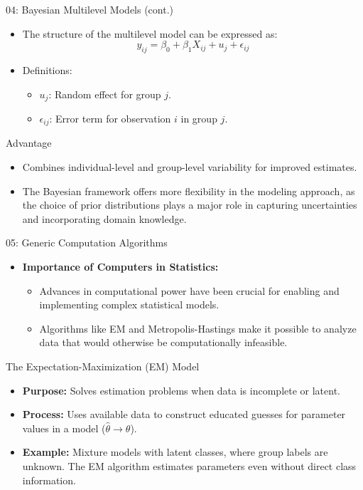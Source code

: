 \documentclass{beamer}
\begin{document}
\begin{frame}{04: Bayesian Multilevel Models (cont.)}
\begin{itemize}
    \item The structure of the multilevel model can be expressed as:
    \[
    y_{ij} = \beta_0 + \beta_1 X_{ij} + u_j + \epsilon_{ij}
    \]
    \item Definitions:
    \begin{itemize}
        \item \( u_j \): Random effect for group \( j \).
        \item \( \epsilon_{ij} \): Error term for observation \( i \) in group \( j \).
    \end{itemize}
\end{itemize}

\begin{block}{Advantage}
\begin{itemize}
\item Combines individual-level and group-level variability for improved estimates.
\item The Bayesian framework offers more flexibility in the modeling approach, as the choice of prior distributions plays a major role in capturing uncertainties and incorporating domain knowledge.
\end{itemize}
\end{block}
\end{frame}



\begin{frame}{05: Generic Computation Algorithms}
\begin{itemize}
    \item \textbf{Importance of Computers in Statistics:}
    \begin{itemize}
        \item Advances in computational power have been crucial for enabling and implementing complex statistical models.
        \item Algorithms like EM and Metropolis-Hastings make it possible to analyze data that would otherwise be computationally infeasible.
    \end{itemize}
\end{itemize}
\end{frame}

\begin{frame}{The Expectation-Maximization (EM) Model}
\begin{itemize}
    \item \textbf{Purpose:} Solves estimation problems when data is incomplete or latent.
    \item \textbf{Process:} Uses available data to construct educated guesses for parameter values in a model (\(\hat{\theta} \to \theta\)).
    \item \textbf{Example:} Mixture models with latent classes, where group labels are unknown. The EM algorithm estimates parameters even without direct class information.
\end{itemize}
\end{frame}
\end{document}

